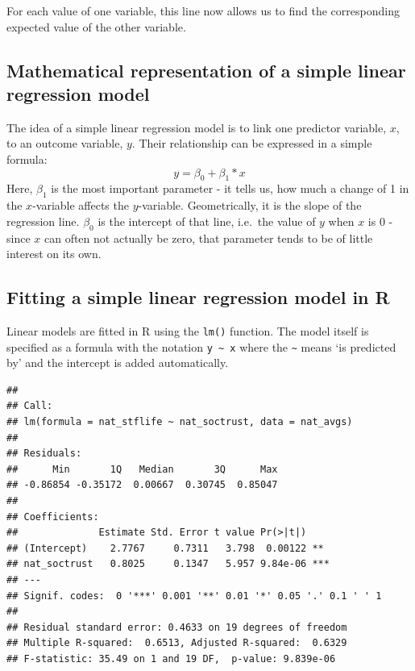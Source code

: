 \documentclass[
]{book}
\newenvironment{Shaded}{\begin{snugshade}}{\end{snugshade}}
\newcommand{\DataTypeTok}[1]{\textcolor[rgb]{0.13,0.29,0.53}{#1}}
\newcommand{\KeywordTok}[1]{\textcolor[rgb]{0.13,0.29,0.53}{\textbf{#1}}}
\newcommand{\NormalTok}[1]{#1}
\newcommand{\OperatorTok}[1]{\textcolor[rgb]{0.81,0.36,0.00}{\textbf{#1}}}
\newcommand{\StringTok}[1]{\textcolor[rgb]{0.31,0.60,0.02}{#1}}
\begin{document}
For each value of one variable, this line now allows us to find the
corresponding expected value of the other variable.

\hypertarget{mathematical-representation-of-a-simple-linear-regression-model}{%
\subsection{Mathematical representation of a simple linear regression model}\label{mathematical-representation-of-a-simple-linear-regression-model}}

The idea of a simple linear regression model is to link one predictor
variable, \(x\), to an outcome variable, \(y\). Their relationship can be
expressed in a simple formula: \[y=\beta_{0} +  \beta_{1}*x\] Here,
\(\beta_{1}\) is the most important parameter - it tells us, how much a
change of 1 in the \(x\)-variable affects the \(y\)-variable. Geometrically,
it is the slope of the regression line. \(\beta_{0}\) is the intercept of
that line, i.e.~the value of \(y\) when \(x\) is 0 - since \(x\) can often not
actually be zero, that parameter tends to be of little interest on its
own.

\hypertarget{fitting-a-simple-linear-regression-model-in-r}{%
\subsection{Fitting a simple linear regression model in R}\label{fitting-a-simple-linear-regression-model-in-r}}

Linear models are fitted in R using the \texttt{lm()} function. The model
itself is specified as a formula with the notation \texttt{y\ \textasciitilde{}\ x} where the \texttt{\textasciitilde{}}
means `is predicted by' and the intercept is added automatically.

\begin{Shaded}
\end{Shaded}

\begin{verbatim}
## 
## Call:
## lm(formula = nat_stflife ~ nat_soctrust, data = nat_avgs)
## 
## Residuals:
##      Min       1Q   Median       3Q      Max 
## -0.86854 -0.35172  0.00667  0.30745  0.85047 
## 
## Coefficients:
##              Estimate Std. Error t value Pr(>|t|)    
## (Intercept)    2.7767     0.7311   3.798  0.00122 ** 
## nat_soctrust   0.8025     0.1347   5.957 9.84e-06 ***
## ---
## Signif. codes:  0 '***' 0.001 '**' 0.01 '*' 0.05 '.' 0.1 ' ' 1
## 
## Residual standard error: 0.4633 on 19 degrees of freedom
## Multiple R-squared:  0.6513,	Adjusted R-squared:  0.6329 
## F-statistic: 35.49 on 1 and 19 DF,  p-value: 9.839e-06
\end{verbatim}
\end{document}
